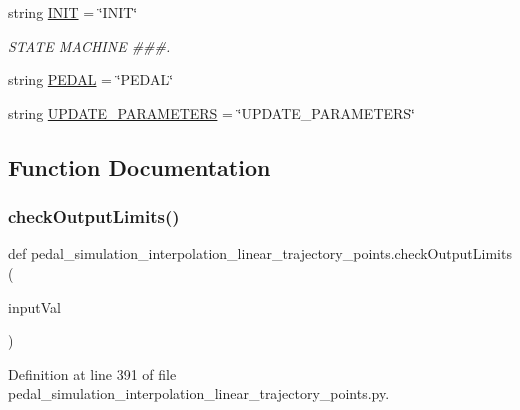 \begin{DoxyCompactItemize}
\item 
string \mbox{\hyperlink{namespacepedal__simulation__interpolation__linear__trajectory__points_ab8cabfeb707015adbd71d6bef236a23a}{I\+N\+IT}} = \char`\"{}I\+N\+IT\char`\"{}
\begin{DoxyCompactList}\small\item\em S\+T\+A\+TE M\+A\+C\+H\+I\+NE \#\#\#. \end{DoxyCompactList}\item 
string \mbox{\hyperlink{namespacepedal__simulation__interpolation__linear__trajectory__points_ad153ee88b7219453ffb7121f2bd7e29f}{P\+E\+D\+AL}} = \char`\"{}P\+E\+D\+AL\char`\"{}
\item 
string \mbox{\hyperlink{namespacepedal__simulation__interpolation__linear__trajectory__points_a2662ff45979e02a3e142a88c51b48225}{U\+P\+D\+A\+T\+E\+\_\+\+P\+A\+R\+A\+M\+E\+T\+E\+RS}} = \char`\"{}U\+P\+D\+A\+T\+E\+\_\+\+P\+A\+R\+A\+M\+E\+T\+E\+RS\char`\"{}
\end{DoxyCompactItemize}


\subsection{Function Documentation}
\mbox{\label{namespacepedal__simulation__interpolation__linear__trajectory__points_a66385fbebb1478a8f7666e94252cd986}} 
\subsubsection{\texorpdfstring{checkOutputLimits()}{checkOutputLimits()}}
{\footnotesize\ttfamily def pedal\+\_\+simulation\+\_\+interpolation\+\_\+linear\+\_\+trajectory\+\_\+points.\+check\+Output\+Limits (\begin{DoxyParamCaption}\item[{}]{input\+Val }\end{DoxyParamCaption})}



Definition at line 391 of file pedal\+\_\+simulation\+\_\+interpolation\+\_\+linear\+\_\+trajectory\+\_\+points.\+py.


